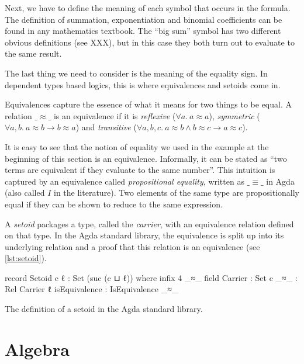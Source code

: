 Next, we have to define the meaning of each symbol that occurs in the formula. The definition of summation, exponentiation and binomial coefficients can be found in any mathematics textbook. The \enquote{big sum} symbol has two different obvious definitions (see XXX), but in this case they both turn out to evaluate to the same result.

The last thing we need to consider is the meaning of the equality sign. In dependent types based logics, this is where equivalences and setoids come in.


Equivalences capture the essence of what it means for two things to be equal. A relation \(\_\!\!\approx\!\!\_\) is an equivalence if it is \emph{reflexive} (\(\forall a.\ a \approx a\)), \emph{symmetric} (\(\forall a,b.\ a \approx b \rightarrow b \approx a\)) and \emph{transitive} (\(\forall a,b,c.\ a \approx b \wedge b \approx c \rightarrow a \approx c\)).

It is easy to see that the notion of equality we used in the example at the beginning of this section is an equivalence. Informally, it can be stated as \enquote{two terms are equivalent if they evaluate to the same number}. This intuition is captured by an equivalence called \emph{propositional equality}, written as \(\_\!\!\equiv\!\!\_\) in Agda (also called \(I\) in the literature). Two elements of the same type are propositionally equal if they can be shown to reduce to the same expression.


A \emph{setoid} packages a type, called the \emph{carrier}, with an equivalence relation defined on that type. In the Agda standard library, the equivalence is split up into its underlying relation and a proof that this relation is an equivalence (see \cref{lst:setoid}).

\begin{listing}[h]
    \begin{agdacode}
record Setoid c ℓ : Set (suc (c ⊔ ℓ)) where
  infix 4 _≈_
  field
    Carrier       : Set c
    _≈_           : Rel Carrier ℓ
    isEquivalence : IsEquivalence _≈_
    \end{agdacode}
    \label{lst:setoid}
    \caption{The definition of a setoid in the Agda standard library.}
\end{listing}


\section{Algebra}

